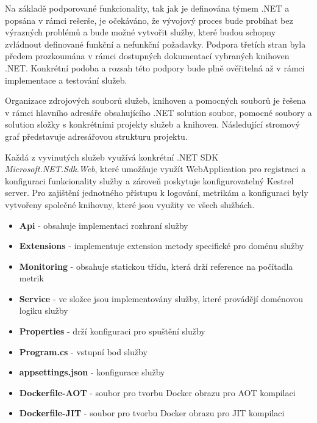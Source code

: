 
Na základě podporované funkcionality, tak jak je definována týmem .NET a popsána v rámci rešerše, je očekáváno, že vývojový proces bude probíhat bez výrazných problémů a bude možné vytvořit služby, které budou schopny zvládnout definované funkční a nefunkční požadavky. Podpora třetích stran byla předem prozkoumána v rámci dostupných dokumentací vybraných knihoven .NET. Konkrétní podoba a rozsah této podpory bude plně ověřitelná až v rámci implementace a testování služeb.


Organizace zdrojových souborů služeb, knihoven a pomocných souborů je řešena v rámci hlavního adresáře obsahujícího .NET solution soubor, pomocné soubory a solution složky s konkrétními projekty služeb a knihoven. Následující
stromový graf představuje adresářovou strukturu projektu.


Každá z vyvinutých služeb využívá konkrétní .NET SDK \emph{Microsoft.NET.Sdk.Web}, které umožňuje využít WebApplication pro registraci a konfiguraci funkcionality služby a zároveň poskytuje konfigurovatelný Kestrel server. Pro zajištění jednotného přístupu k logování, metrikám a konfiguraci byly vytvořeny společné knihovny, které jsou využity ve všech službách.


\begin{itemize}
  \item \textbf{Api} - obsahuje implementaci rozhraní služby
  \item \textbf{Extensions} - implementuje extension metody specifické pro doménu služby
  \item \textbf{Monitoring} - obsahuje statickou třídu, která drží reference na počítadla metrik
  \item \textbf{Service} - ve složce jsou implementovány služby, které provádějí doménovou logiku služby
  \item \textbf{Properties} - drží konfiguraci pro spuštění služby
  \item \textbf{Program.cs} - vstupní bod služby
  \item \textbf{appsettings.json} - konfigurace služby
  \item \textbf{Dockerfile-AOT} - soubor pro tvorbu Docker obrazu pro AOT kompilaci
  \item \textbf{Dockerfile-JIT} - soubor pro tvorbu Docker obrazu pro JIT kompilaci
\end{itemize}

